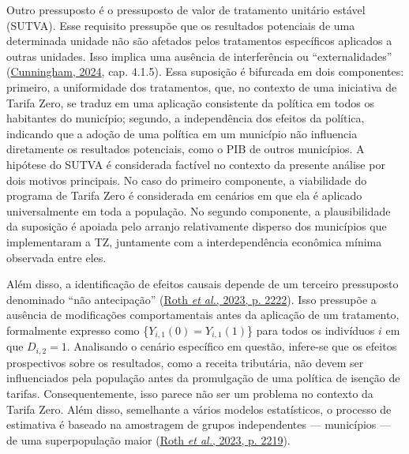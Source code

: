 \documentclass[12pt, a4paper, twoside]{article}
\numberwithin{equation}{subsection} %
\begin{document}
Outro pressuposto é o pressuposto de valor de tratamento unitário
estável (SUTVA). Esse requisito pressupõe que os resultados potenciais
de uma determinada unidade não são afetados pelos tratamentos
específicos aplicados a outras unidades. Isso implica uma ausência de
interferência ou ``externalidades''
(\protect\hyperlink{ref-cunningham_causal_2024}{Cunningham, 2024}, cap.
4.1.5). Essa suposição é bifurcada em dois componentes: primeiro, a
uniformidade dos tratamentos, que, no contexto de uma iniciativa de
Tarifa Zero, se traduz em uma aplicação consistente da política em todos
os habitantes do município; segundo, a independência dos efeitos da
política, indicando que a adoção de uma política em um município não
influencia diretamente os resultados potenciais, como o PIB de outros
municípios. A hipótese do SUTVA é considerada factível no contexto da
presente análise por dois motivos principais. No caso do primeiro
componente, a viabilidade do programa de Tarifa Zero é considerada em
cenários em que ela é aplicado universalmente em toda a população. No
segundo componente, a plausibilidade da suposição é apoiada pelo arranjo
relativamente disperso dos municípios que implementaram a TZ, juntamente
com a interdependência econômica mínima observada entre eles.

Além disso, a identificação de efeitos causais depende de um terceiro
pressuposto denominado ``não antecipação''
(\protect\hyperlink{ref-roth_whats_2023}{Roth \emph{et al.}, 2023, p.
2222}). Isso pressupõe a ausência de modificações comportamentais antes
da aplicação de um tratamento, formalmente expresso como
\{\(Y_{i,1}(0) = Y_{i,1}(1)\)\} para todos os indivíduos \(i\) em que
\(D_{i,2} = 1\). Analisando o cenário específico em questão, infere-se
que os efeitos prospectivos sobre os resultados, como a receita
tributária, não devem ser influenciados pela população antes da
promulgação de uma política de isenção de tarifas. Consequentemente,
isso parece não ser um problema no contexto da Tarifa Zero. Além disso,
semelhante a vários modelos estatísticos, o processo de estimativa é
baseado na amostragem de grupos independentes --- municípios --- de uma
superpopulação maior (\protect\hyperlink{ref-roth_whats_2023}{Roth
\emph{et al.}, 2023, p. 2219}).
\end{document}
